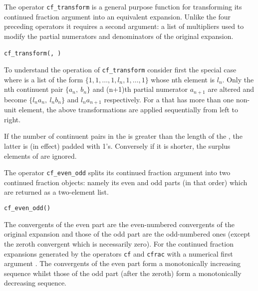 \hypertarget{operator:CF_TRANSFORM}{}
The operator \texttt{cf\_transform}
is a general purpose function
for transforming its continued fraction argument  into
an equivalent expansion. Unlike the four preceding operators it requires
a second argument: a list of multipliers used to modify the partial
numerators and denominators of the original expansion.
\begin{syntaxtable}
  \texttt{cf\_transform(}\texttt{,}\,%
  \texttt{)}
\end{syntaxtable}
To understand the operation of \texttt{cf\_transform} consider first the
special case where  is a list of the
form $\{1, 1, \ldots, 1, l_n, 1, \ldots, 1\}$ whose nth element is $l_n$.
Only the nth continuent pair $\{a_n,\ b_n\}$ and (n+1)th partial numerator
$a_{n+1}$ are altered and become $\{l_na_n,\ l_nb_n\}$ and $l_na_{n+1}$
respectively. For a  that has more than one non-unit
element, the above transformations are applied sequentially from left to
right.

If the number of continuent pairs in the 
is greater than the length of the , the latter is
(in effect) padded with 1's. Conversely if it is shorter, the surplus
elements of  are ignored.

\hypertarget{operator:CF_EVEN_ODD}{}
The operator \texttt{cf\_even\_odd}
 splits its continued fraction argument
 into two continued fraction objects: namely its even and
odd parts (in that order) which are returned as a two-element list.
\begin{syntaxtable}
  \texttt{cf\_even\_odd(}\texttt{)}
\end{syntaxtable}
The convergents of the even part are the even-numbered convergents of the
original expansion and those of the odd part are the odd-numbered ones
(except the zeroth convergent which is necessarily zero).  For the continued
fraction expansions generated by the operators \texttt{cf} and
\texttt{cfrac} with a numerical first argument . The convergents of
the even part form a monotonically increasing sequence whilst those of the
odd part (after the zeroth) form a monotonically decreasing sequence.

